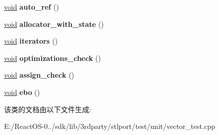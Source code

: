 \begin{DoxyCompactItemize}
\hyperlink{interfacevoid}{void} {\bfseries auto\+\_\+ref} ()
\item 
\mbox{\label{class_vector_test_aad26c360f83b22d2982445a24280ff3a}} 
\hyperlink{interfacevoid}{void} {\bfseries allocator\+\_\+with\+\_\+state} ()
\item 
\mbox{\label{class_vector_test_a0c78efdf90ff424b1cfc0b54e46c90b1}} 
\hyperlink{interfacevoid}{void} {\bfseries iterators} ()
\item 
\mbox{\label{class_vector_test_a68eae181dc353989fba8e51343a16b19}} 
\hyperlink{interfacevoid}{void} {\bfseries optimizations\+\_\+check} ()
\item 
\mbox{\label{class_vector_test_a20021c9cd8f2b43bbb8f60d3a647e86e}} 
\hyperlink{interfacevoid}{void} {\bfseries assign\+\_\+check} ()
\item 
\mbox{\label{class_vector_test_a739472118c05d0ef8718bca0afbd0a8f}} 
\hyperlink{interfacevoid}{void} {\bfseries ebo} ()
\end{DoxyCompactItemize}


该类的文档由以下文件生成\+:\begin{DoxyCompactItemize}
\item 
E\+:/\+React\+O\+S-\/0../sdk/lib/3rdparty/stlport/test/unit/vector\+\_\+test.\+cpp\end{DoxyCompactItemize}
